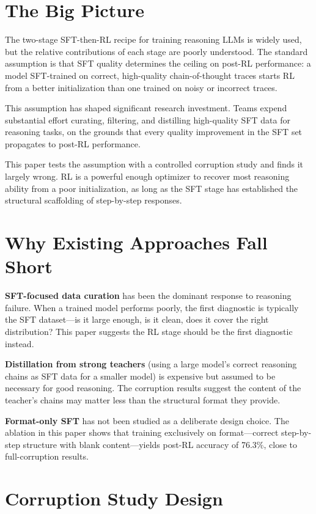 \documentclass[10pt,twocolumn]{article}
\begin{document}
\section{The Big Picture}

The two-stage SFT-then-RL recipe for training reasoning LLMs is widely used, but the relative contributions of each stage are poorly understood.
The standard assumption is that SFT quality determines the ceiling on post-RL performance: a model SFT-trained on correct, high-quality chain-of-thought traces starts RL from a better initialization than one trained on noisy or incorrect traces.

This assumption has shaped significant research investment.
Teams expend substantial effort curating, filtering, and distilling high-quality SFT data for reasoning tasks, on the grounds that every quality improvement in the SFT set propagates to post-RL performance.

This paper tests the assumption with a controlled corruption study and finds it largely wrong.
RL is a powerful enough optimizer to recover most reasoning ability from a poor initialization, as long as the SFT stage has established the structural scaffolding of step-by-step responses.

\section{Why Existing Approaches Fall Short}

\textbf{SFT-focused data curation} has been the dominant response to reasoning failure.
When a trained model performs poorly, the first diagnostic is typically the SFT dataset---is it large enough, is it clean, does it cover the right distribution?
This paper suggests the RL stage should be the first diagnostic instead.

\textbf{Distillation from strong teachers} (using a large model's correct reasoning chains as SFT data for a smaller model) is expensive but assumed to be necessary for good reasoning.
The corruption results suggest the content of the teacher's chains may matter less than the structural format they provide.

\textbf{Format-only SFT} has not been studied as a deliberate design choice.
The ablation in this paper shows that training exclusively on format---correct step-by-step structure with blank content---yields post-RL accuracy of 76.3\%, close to full-corruption results.

\section{Corruption Study Design}
\end{document}
